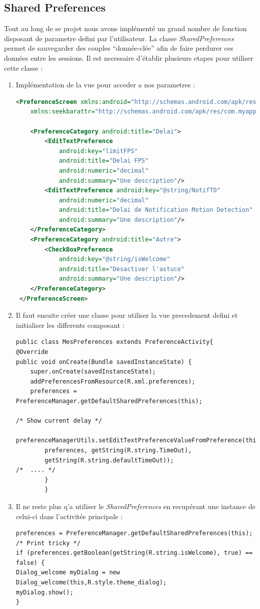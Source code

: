 \subsection{Shared Preferences}
Tout au long de se projet nous avons implémenté un grand nombre de fonction
disposant de parametre defini par l'utilisateur.
La classe \textit{SharedPreferences} permet de sauvegarder des couples
``donnée-clée'' afin de faire perdurer ces données entre les sessions.\newline
Il est necessaire d'établir plusieurs etapes pour utiliser cette classe : 
\begin{enumerate}
  \item Implémentation de la vue pour acceder a nos parametres :
  \begin{lstlisting}[language=XML, format=XML]
  <PreferenceScreen xmlns:android="http://schemas.android.com/apk/res/android"
	xmlns:seekbarattr="http://schemas.android.com/apk/res/com.myapps">

	<PreferenceCategory android:title="Delai">
		<EditTextPreference 
			android:key="limitFPS"
			android:title="Delai FPS" 
			android:numeric="decimal"
			android:summary="Une description"/>
		<EditTextPreference android:key="@string/NotifTO"
			android:numeric="decimal"
			android:title="Delai de Notification Motion Detection"
			android:summary="Une description"/>
	</PreferenceCategory>
	<PreferenceCategory android:title="Autre">
		<CheckBoxPreference 
			android:key="@string/isWelcome"
			android:title="Desactiver l'astuce"
			android:summary="Une description"/>
	</PreferenceCategory>
 </PreferenceScreen> 
  \end{lstlisting}
\item Il faut ensuite créer une classe pour utiliser la vue precedement
defini et initialiser les differents composant :
\begin{lstlisting}
public class MesPreferences extends PreferenceActivity{
@Override
public void onCreate(Bundle savedInstanceState) {
	super.onCreate(savedInstanceState);
	addPreferencesFromResource(R.xml.preferences);
	preferences = PreferenceManager.getDefaultSharedPreferences(this);

/* Show current delay */
	preferenceManagerUtils.setEditTextPreferenceValueFromPreference(this,
		preferences, getString(R.string.TimeOut),
		getString(R.string.defaultTimeOut));
/*	.... */
		}
		}
\end{lstlisting}
\item Il ne reste plus q'a utiliser le \textit{SharedPreferences} en recupérant
une instance de celui-ci dans l'activitée principale : 
\begin{lstlisting}
preferences = PreferenceManager.getDefaultSharedPreferences(this);
/* Print tricky */
if (preferences.getBoolean(getString(R.string.isWelcome), true) == false) {
Dialog_welcome myDialog = new Dialog_welcome(this,R.style.theme_dialog);
myDialog.show();
}
\end{lstlisting}
\end{enumerate}
